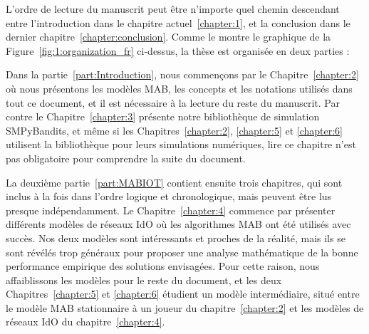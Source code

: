 \begin{resume_fr}
L'ordre de lecture du manuscrit peut être n'importe quel chemin descendant entre l'introduction dans le chapitre actuel~\ref{chapter:1}, et la conclusion dans le dernier chapitre~\ref{chapter:conclusion}.
Comme le montre le graphique de la Figure~\ref{fig:1:organization_fr} ci-dessus,
la thèse est organisée en deux parties :

Dans la partie~\ref{part:Introduction}, nous commençons par le Chapitre~\ref{chapter:2} où nous présentons les modèles MAB, les concepts et les notations utilisés dans tout ce document, et il est nécessaire à la lecture du reste du manuscrit.
Par contre le Chapitre~\ref{chapter:3} présente notre bibliothèque de simulation SMPyBandits, et même si les Chapitres~\ref{chapter:2}, \ref{chapter:5} et \ref{chapter:6} utilisent la bibliothèque pour leurs simulations numériques, lire ce chapitre n'est pas obligatoire pour comprendre la suite du document.

La deuxième partie~\ref{part:MABIOT} contient ensuite trois chapitres, qui sont inclus à la fois dans l'ordre logique et chronologique, mais peuvent être lus presque indépendamment.
Le Chapitre~\ref{chapter:4} commence par présenter différents modèles de réseaux IdO où les algorithmes MAB ont été utilisés avec succès. Nos deux modèles sont intéressants et proches de la réalité, mais ils se sont révélés trop généraux pour proposer une analyse mathématique de la bonne performance empirique des solutions envisagées.
Pour cette raison, nous affaiblissons les modèles pour le reste du document,
et les deux Chapitres~\ref{chapter:5} et \ref{chapter:6} étudient un modèle intermédiaire, situé entre le modèle MAB stationnaire à un joueur du chapitre~\ref{chapter:2} et les modèles de réseaux IdO du chapitre~\ref{chapter:4}.

\end{resume_fr}
